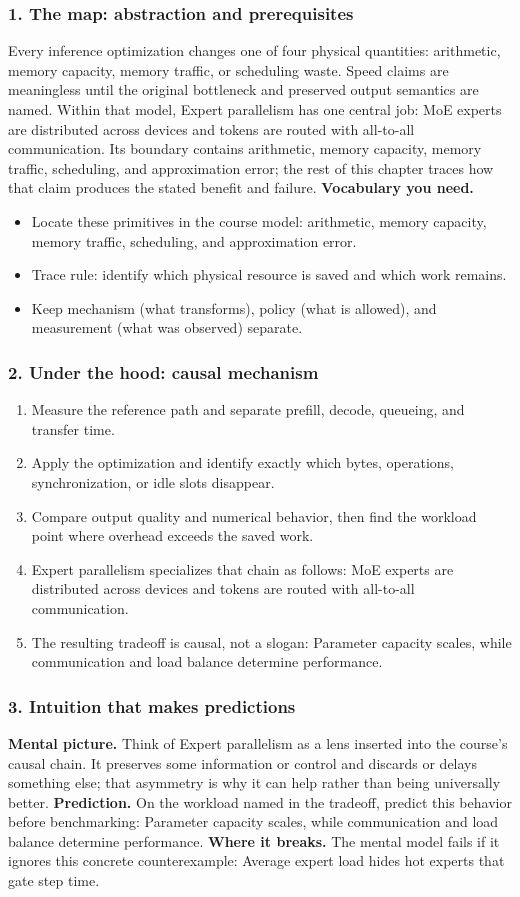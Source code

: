 \subsubsection*{1. The map: abstraction and prerequisites}
Every inference optimization changes one of four physical quantities: arithmetic, memory capacity, memory traffic, or scheduling waste. Speed claims are meaningless until the original bottleneck and preserved output semantics are named.
Within that model, Expert parallelism has one central job: MoE experts are distributed across devices and tokens are routed with all-to-all communication. Its boundary contains arithmetic, memory capacity, memory traffic, scheduling, and approximation error; the rest of this chapter traces how that claim produces the stated benefit and failure.
\textbf{Vocabulary you need.}\begin{itemize}
\item Locate these primitives in the course model: arithmetic, memory capacity, memory traffic, scheduling, and approximation error.
\item Trace rule: identify which physical resource is saved and which work remains.
\item Keep mechanism (what transforms), policy (what is allowed), and measurement (what was observed) separate.
\end{itemize}
\subsubsection*{2. Under the hood: causal mechanism}\begin{enumerate}
\item Measure the reference path and separate prefill, decode, queueing, and transfer time.
\item Apply the optimization and identify exactly which bytes, operations, synchronization, or idle slots disappear.
\item Compare output quality and numerical behavior, then find the workload point where overhead exceeds the saved work.
\item Expert parallelism specializes that chain as follows: MoE experts are distributed across devices and tokens are routed with all-to-all communication.
\item The resulting tradeoff is causal, not a slogan: Parameter capacity scales, while communication and load balance determine performance.
\end{enumerate}
\subsubsection*{3. Intuition that makes predictions}
\textbf{Mental picture.} Think of Expert parallelism as a lens inserted into the course's causal chain. It preserves some information or control and discards or delays something else; that asymmetry is why it can help rather than being universally better.
\textbf{Prediction.} On the workload named in the tradeoff, predict this behavior before benchmarking: Parameter capacity scales, while communication and load balance determine performance.
\textbf{Where it breaks.} The mental model fails if it ignores this concrete counterexample: Average expert load hides hot experts that gate step time.
